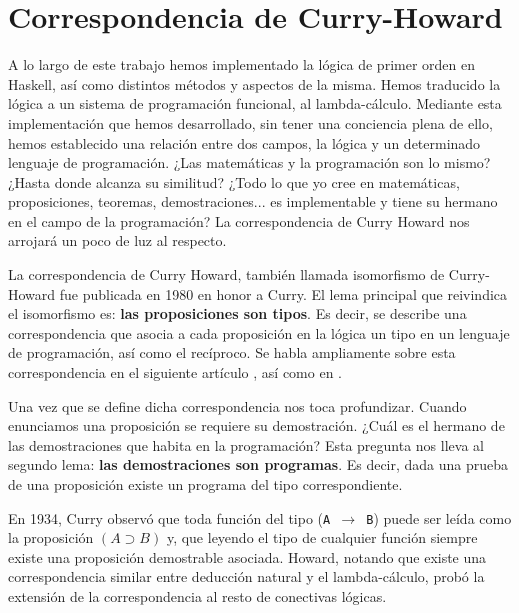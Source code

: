 \chapter{Correspondencia de Curry-Howard}\label{sec:curry}

A lo largo de este trabajo hemos implementado la lógica de primer orden
en Haskell, así como distintos métodos y aspectos de la misma. Hemos
traducido la lógica a un sistema de programación funcional, al lambda-cálculo.
Mediante esta implementación que hemos desarrollado, sin tener una conciencia
plena de ello, hemos establecido una relación entre dos campos, la lógica y
un determinado lenguaje de programación. ¿Las matemáticas y la programación
son lo mismo? ¿Hasta donde alcanza su similitud? ¿Todo lo que yo cree en
matemáticas, proposiciones, teoremas, demostraciones... es implementable y
tiene su hermano en el campo de la programación? La correspondencia de Curry
Howard nos arrojará un poco de luz al respecto.

\vspace{5mm}

La correspondencia de Curry Howard, también llamada isomorfismo de Curry-Howard
fue publicada en 1980 en honor a Curry. El lema principal que reivindica el isomorfismo es:
\textbf{las proposiciones son tipos}. Es decir, se describe una correspondencia
que asocia a cada proposición en la lógica un tipo en un lenguaje de programación,
así como el recíproco. Se habla ampliamente sobre esta correspondencia en el siguiente artículo \cite{Wadler14}, así como en \cite{Roman2016}.

\vspace{5mm}
Una vez que se define dicha correspondencia nos toca profundizar. Cuando
enunciamos una proposición se requiere su demostración. ¿Cuál es el hermano
de las demostraciones que habita en la programación? Esta pregunta nos lleva al segundo
lema: \textbf{las demostraciones son programas}. Es decir, dada una prueba de
una proposición existe un programa del tipo correspondiente.

\vspace{5mm}


En 1934, Curry observó que toda función del tipo (\texttt{A $\rightarrow$ B})
puede ser leída como la proposición $(A\supset B)$ y, que leyendo el tipo de
cualquier función siempre existe una proposición demostrable asociada. Howard,
notando que existe una correspondencia similar entre deducción natural y el
lambda-cálculo, probó la extensión de la correspondencia al resto de conectivas lógicas.

